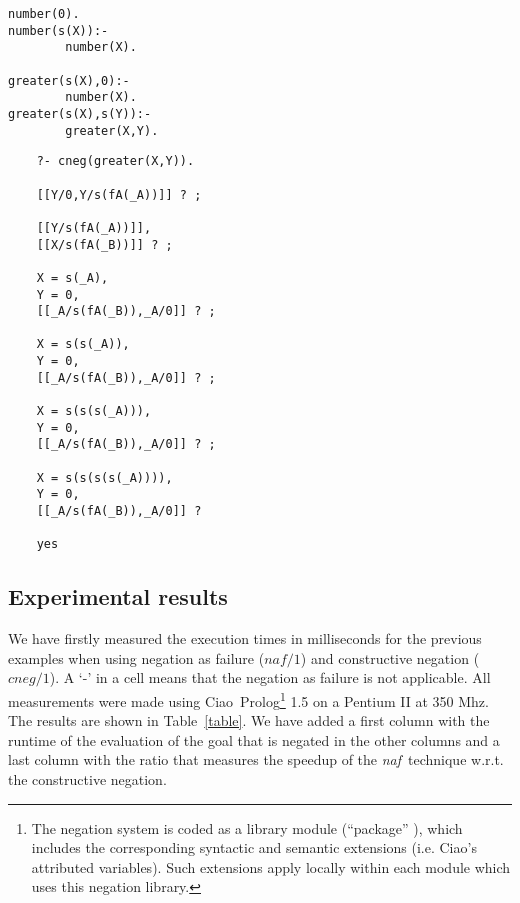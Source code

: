 \documentclass{llncs}
\newcommand{\naf}{{\em naf}}\newcommand{\viejo}[1]{}
\newcommand{\ciao}{Ciao}
\begin{document}
\begin{minipage}{2in}
\begin{verbatim}
number(0).
number(s(X)):-
        number(X).

greater(s(X),0):-
        number(X).
greater(s(X),s(Y)):-
        greater(X,Y).
\end{verbatim}
\end{minipage}
\begin{minipage}{2in}
\begin{verbatim} 
    ?- cneg(greater(X,Y)).

    [[Y/0,Y/s(fA(_A))]] ? ;

    [[Y/s(fA(_A))]],
    [[X/s(fA(_B))]] ? ;

    X = s(_A),
    Y = 0,
    [[_A/s(fA(_B)),_A/0]] ? ;

    X = s(s(_A)),
    Y = 0,
    [[_A/s(fA(_B)),_A/0]] ? ;

    X = s(s(s(_A))),
    Y = 0,
    [[_A/s(fA(_B)),_A/0]] ? ;

    X = s(s(s(s(_A)))),
    Y = 0,
    [[_A/s(fA(_B)),_A/0]] ? 

    yes
\end{verbatim} 
\end{minipage}



\subsection{Experimental results}
\label{results}

We have firstly measured the execution times in milliseconds for the
previous examples when using negation as failure ($naf/1$) and
constructive negation ($cneg/1$). A `-' in a cell means that the
negation as failure is not applicable. All measurements were made
using \ciao\ Prolog\footnote{The negation system is coded as a library
  module (``package'' \cite{ciao-modules-cl2000}), which includes the
  corresponding syntactic and semantic extensions (i.e. Ciao's
  attributed variables). Such extensions apply locally within each
  module which uses this negation library.} 1.5 on a Pentium II at 350
Mhz. The results are shown in Table~\ref{table}. We have added a first
column with the runtime of the evaluation of the goal that is negated
in the other columns and a last column with the ratio that measures the
speedup of the \naf\ technique w.r.t. the constructive negation.
\end{document}
